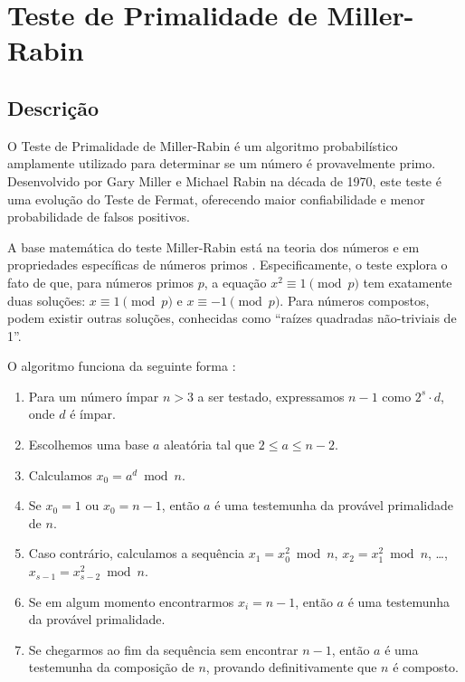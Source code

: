 \section{Teste de Primalidade de Miller-Rabin}

\subsection{Descrição}

O Teste de Primalidade de Miller-Rabin é um algoritmo probabilístico amplamente utilizado para determinar se um número é provavelmente primo. Desenvolvido por Gary Miller \cite{miller1976riemann} e Michael Rabin \cite{rabin1980probabilistic} na década de 1970, este teste é uma evolução do Teste de Fermat, oferecendo maior confiabilidade e menor probabilidade de falsos positivos.

A base matemática do teste Miller-Rabin está na teoria dos números e em propriedades específicas de números primos \cite{miller1976riemann, shoup2009computational}. Especificamente, o teste explora o fato de que, para números primos $p$, a equação $x^2 \equiv 1 \pmod{p}$ tem exatamente duas soluções: $x \equiv 1 \pmod{p}$ e $x \equiv -1 \pmod{p}$. Para números compostos, podem existir outras soluções, conhecidas como ``raízes quadradas não-triviais de 1''.

O algoritmo funciona da seguinte forma \cite{miller1976riemann}:

\begin{enumerate}
    \item Para um número ímpar $n > 3$ a ser testado, expressamos $n-1$ como $2^s \cdot d$, onde $d$ é ímpar.
    \item Escolhemos uma base $a$ aleatória tal que $2 \leq a \leq n-2$.
    \item Calculamos $x_0 = a^d \bmod n$.
    \item Se $x_0 = 1$ ou $x_0 = n-1$, então $a$ é uma testemunha da provável primalidade de $n$.
    \item Caso contrário, calculamos a sequência $x_1 = x_0^2 \bmod n$, $x_2 = x_1^2 \bmod n$, \ldots, $x_{s-1} = x_{s-2}^2 \bmod n$.
    \item Se em algum momento encontrarmos $x_i = n-1$, então $a$ é uma testemunha da provável primalidade.
    \item Se chegarmos ao fim da sequência sem encontrar $n-1$, então $a$ é uma testemunha da composição de $n$, provando definitivamente que $n$ é composto.
\end{enumerate}


